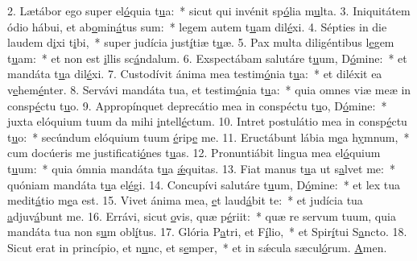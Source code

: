 2. Lætábor ego super el\uline{ó}quia t\uline{u}a:~* sicut qui invénit sp\uline{ó}lia m\uline{u}lta.
3. Iniquitátem ódio hábui, et ab\uline{o}min\uline{á}tus sum:~* legem autem t\uline{u}am dil\uline{é}xi.
4. Sépties in die laudem d\uline{i}xi t\uline{i}bi,~* super judícia just\uline{í}tiæ t\uline{u}æ.
5. Pax multa diligéntibus l\uline{e}gem t\uline{u}am:~* et non est \uline{i}llis sc\uline{á}ndalum.
6. Exspectábam salutáre t\uline{u}um, D\uline{ó}mine:~* et mandáta t\uline{u}a dil\uline{é}xi.
7. Custodívit ánima mea testim\uline{ó}nia t\uline{u}a:~* et diléxit ea v\uline{e}hem\uline{é}nter.
8. Servávi mandáta tua, et testim\uline{ó}nia t\uline{u}a:~* quia omnes viæ meæ in consp\uline{é}ctu t\uline{u}o.
9. Appropínquet deprecátio mea in conspéctu t\uline{u}o, D\uline{ó}mine:~* juxta elóquium tuum da mihi \uline{i}ntell\uline{é}ctum.
10. Intret postulátio mea in consp\uline{é}ctu t\uline{u}o:~* secúndum elóquium tuum \uline{é}rip\uline{e} me.
11. Eructábunt lábia m\uline{e}a h\uline{y}mnum,~* cum docúeris me justificati\uline{ó}nes t\uline{u}as.
12. Pronuntiábit lingua mea el\uline{ó}quium t\uline{u}um:~* quia ómnia mandáta t\uline{u}a \uline{ǽ}quitas.
13. Fiat manus t\uline{u}a ut s\uline{a}lvet me:~* quóniam mandáta t\uline{u}a el\uline{é}gi.
14. Concupívi salutáre t\uline{u}um, D\uline{ó}mine:~* et lex tua medit\uline{á}tio m\uline{e}a est.
15. Vivet ánima mea, \uline{e}t laud\uline{á}bit te:~* et judícia tua \uline{a}djuv\uline{á}bunt me.
16. Errávi, sicut \uline{o}vis, quæ p\uline{é}riit:~* quæ re servum tuum, quia mandáta tua non s\uline{u}m obl\uline{í}tus.
17. Glória P\uline{a}tri, et F\uline{í}lio,~* et Spir\uline{í}tui S\uline{a}ncto.
18. Sicut erat in princípio, et n\uline{u}nc, et s\uline{e}mper,~* et in sǽcula sæcul\uline{ó}rum. \uline{A}men.
